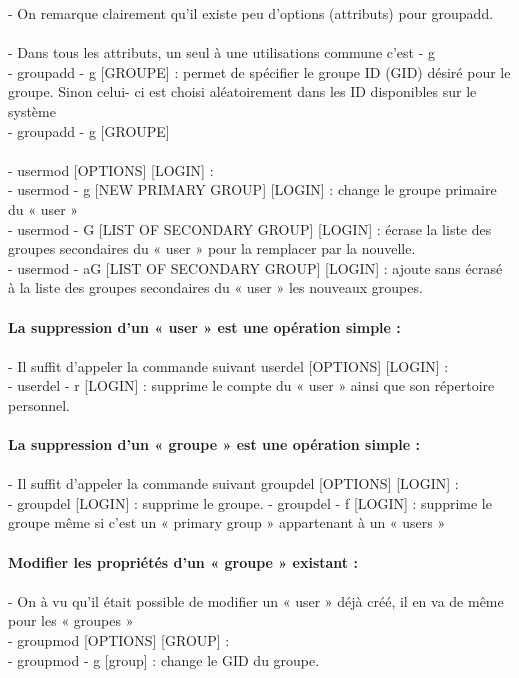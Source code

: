 \documentclass[10pt,a4paper]{article}
\begin{document}
- On remarque clairement qu’il existe peu d’options (attributs) pour groupadd.\\\\
- Dans tous les attributs, un seul à une utilisations commune c’est - g \\
- groupadd - g [GROUPE] : permet de spécifier le groupe ID (GID) désiré pour le groupe. Sinon celui- ci est choisi aléatoirement dans les ID disponibles sur le système \\
- groupadd - g [GROUPE]\\\\
- usermod [OPTIONS] [LOGIN] :  \\
- usermod - g [NEW PRIMARY GROUP] [LOGIN] : change le groupe primaire du « user »  \\
- usermod - G [LIST OF SECONDARY GROUP] [LOGIN] : écrase la liste des groupes secondaires du « user » pour la remplacer par la nouvelle.  \\
- usermod - aG [LIST OF SECONDARY GROUP] [LOGIN] : ajoute sans écrasé à la liste des groupes secondaires du « user » les nouveaux groupes. \\\\
{\large\textbf{La suppression d’un « user » est une opération simple :}}\\\\
- Il suffit d’appeler la commande suivant userdel [OPTIONS] [LOGIN] :  \\
- userdel - r [LOGIN] : supprime le compte du « user » ainsi que son répertoire personnel.\\\\
{\large\textbf{La suppression d’un « groupe » est une opération simple :}}\\\\
- Il suffit d’appeler la commande suivant groupdel [OPTIONS] [LOGIN] : \\
- groupdel [LOGIN] : supprime le groupe. - groupdel - f [LOGIN] : supprime le groupe même si c’est un « primary group » appartenant à un « users »\\\\
{\large\textbf{Modifier les propriétés d’un « groupe » existant :}}\\\\
- On à vu qu’il était possible de modifier un « user » déjà créé, il en va de même pour les « groupes »  \\
- groupmod [OPTIONS] [GROUP] : \\
- groupmod - g [group] : change le GID du groupe.\\\\
\end{document}

